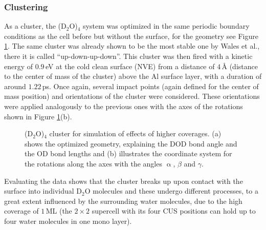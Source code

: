\documentclass[11pt,DIV=13,BCOR=5mm,a4paper,headinclude]{scrbook}
\begin{document}
\subsubsection{Clustering}\label{clusters}
As a cluster, the (D$_2$O)$_4$ system was optimized in the same periodic boundary conditions as the cell before but without the surface, for the geometry see Figure \ref{abb:D2Ocluster}.
The same cluster was already shown to be the most stable one by Wales et al.\cite{Wales97}, there it is called ``up-down-up-down''.
This cluster was then fired with a kinetic energy of $0.9\,$eV at the cold clean surface (NVE) from a distance of $4\,$\AA{} (distance to the center of mass of the cluster) above the Al surface layer, with a duration of around $1.22\,$ps.
Once again, several impact points (again defined for the center of mass position) and orientations of the cluster were considered.
These orientations were applied analogously to the previous ones with the axes of the rotations shown in Figure \ref{abb:D2Ocluster}(b).
\\
\begin{figure} [!ht]
\centering
  \quad
{}
\caption{(D$_2$O)$_4$ cluster for simulation of effects of higher coverages.
(a) shows the optimized geometry, explaining the DOD bond angle and the OD bond lengths and (b) illustrates the coordinate system for the rotations along the axes with the angles $\upalpha$, $\beta$ and $\gamma$.}
       \label{abb:D2Ocluster}
\end{figure}
Evaluating the data shows that the cluster breaks up upon contact with the surface into individual D$_2$O molecules and these undergo different processes, to a great extent influenced by the surrounding water molecules, due to the high coverage of $1\,$ML (the $2\times 2$ supercell with its four CUS positions can hold up to four water molecules in one mono layer).
\end{document}

